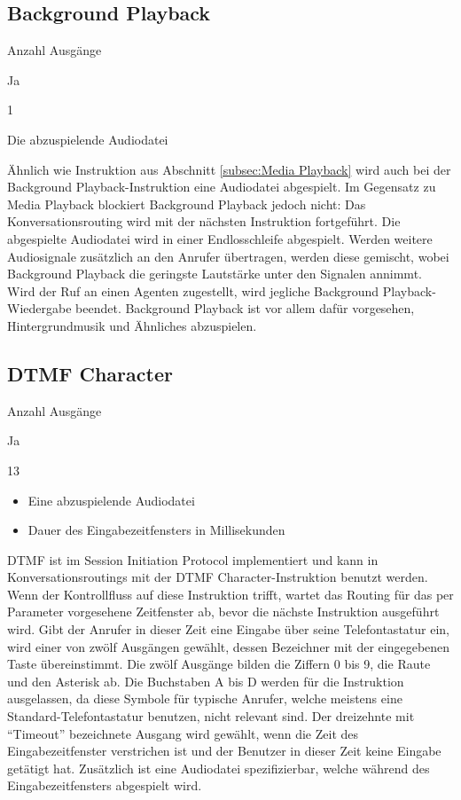 \subsection{Background Playback}
\begin{labeling}{Anzahl Ausgänge}
\item [Eingang] Ja
\item [Anzahl Ausgänge] 1
\item [Parameter] Die abzuspielende Audiodatei
\item [Beschreibung] Ähnlich wie Instruktion aus Abschnitt \ref{subsec:Media Playback} wird auch bei der Background Playback-Instruktion eine Audiodatei abgespielt. Im Gegensatz zu Media Playback blockiert Background Playback jedoch nicht: Das Konversationsrouting wird mit der nächsten Instruktion fortgeführt. Die abgespielte Audiodatei wird in einer Endlosschleife abgespielt. Werden weitere Audiosignale zusätzlich an den Anrufer übertragen, werden diese gemischt, wobei Background Playback die geringste Lautstärke unter den Signalen annimmt. Wird der Ruf an einen Agenten zugestellt, wird jegliche Background Playback-Wiedergabe beendet. Background Playback ist vor allem dafür vorgesehen, Hintergrundmusik und Ähnliches abzuspielen.
\end{labeling}

\subsection{DTMF Character}
\begin{labeling}{Anzahl Ausgänge}
\item [Eingang] Ja
\item [Anzahl Ausgänge] 13
\item [Parameter] \begin{itemize} \item Eine abzuspielende Audiodatei  \item Dauer des Eingabezeitfensters in Millisekunden \end{itemize}
\item [Beschreibung] DTMF ist im Session Initiation Protocol implementiert und kann in Konversationsroutings mit der DTMF Character-Instruktion benutzt werden. Wenn der Kontrollfluss auf diese Instruktion trifft, wartet das Routing für das per Parameter vorgesehene Zeitfenster ab, bevor die nächste Instruktion ausgeführt wird. Gibt der Anrufer in dieser Zeit eine Eingabe über seine Telefontastatur ein, wird einer von zwölf Ausgängen gewählt, dessen Bezeichner mit der eingegebenen Taste übereinstimmt. Die zwölf Ausgänge bilden die Ziffern 0 bis 9, die Raute und den Asterisk ab. Die Buchstaben A bis D werden für die Instruktion ausgelassen, da diese Symbole für typische Anrufer, welche meistens eine Standard-Telefontastatur benutzen, nicht relevant sind. Der dreizehnte mit ``Timeout'' bezeichnete Ausgang wird gewählt, wenn die Zeit des Eingabezeitfenster verstrichen ist und der Benutzer in dieser Zeit keine Eingabe getätigt hat. Zusätzlich ist eine Audiodatei spezifizierbar, welche während des Eingabezeitfensters abgespielt wird.  
\end{labeling}

